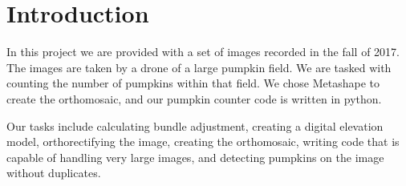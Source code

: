 
\section{Introduction}

In this project we are provided with a set of images recorded in the fall of 2017.
The images are taken by a drone of a large pumpkin field.
We are tasked with counting the number of pumpkins within that ﬁeld.
We chose Metashape to create the orthomosaic, and our pumpkin counter code is written in python.

Our tasks include calculating bundle adjustment,
creating a digital elevation model,
orthorectifying the image,
creating the orthomosaic,
writing code that is capable of handling very large images,
and detecting pumpkins on the image without duplicates.



